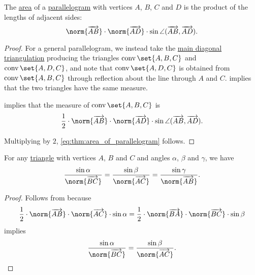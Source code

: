 \begin{proposition}\label{thm:area_of_parallelogram}
  The \hyperref[def:figure_area]{area} of a \hyperref[def:parallelogram]{parallelogram} with vertices \( A \), \( B \), \( C \) and \( D \) is the product of the lengths of adjacent sides:
  \begin{equation}\label{eq:thm:area_of_parallelogram}
    \norm{\vect{AB}} \cdot \norm{\vect{AD}} \cdot \sin\angle(\vect{AB}, \vect{AD}).
  \end{equation}
\end{proposition}
\begin{proof}
  For a general parallelogram, we instead take the \hyperref[thm:diagonal_trapezoid_triangulation]{main diagonal triangulation} producing the triangles \( \conv\set{ A, B, C } \) and \( \conv\set{ A, D, C } \), and note that \( \conv\set{ A, D, C } \) is obtained from \( \conv\set{ A, B, C } \) through reflection about the line through \( A \) and \( C \).  implies that the two triangles have the same measure.

   implies that the measure of \( \conv\set{ A, B, C } \) is
  \begin{equation*}
    \frac 1 2 \cdot \norm{\vect{AB}} \cdot \norm{\vect{AD}} \cdot \sin\angle(\vect{AB}, \vect{AD}).
  \end{equation*}

  Multiplying by \( 2 \), \eqref{eq:thm:area_of_parallelogram} follows.
\end{proof}

\begin{theorem}\label{thm:law_of_sines}
  For any \hyperref[def:triangle]{triangle} with vertices \( A \), \( B \) and \( C \) and angles \( \alpha \), \( \beta \) and \( \gamma \), we have
  \begin{equation}\label{eq:thm:law_of_sines}
    \frac {\sin \alpha} {\norm{\vect{BC}}}
    =
    \frac {\sin \beta} {\norm{\vect{AC}}}
    =
    \frac {\sin \gamma} {\norm{\vect{AB}}}.
  \end{equation}
\end{theorem}
\begin{proof}
  Follows from  because
  \begin{equation*}
    \frac 1 2 \cdot \norm{\vect{AB}} \cdot \norm{\vect{AC}} \cdot \sin \alpha
    =
    \frac 1 2 \cdot \norm{\vect{BA}} \cdot \norm{\vect{BC}} \cdot \sin \beta
  \end{equation*}
  implies
  \begin{equation*}
    \frac {\sin \alpha} {\norm{\vect{BC}}}
    =
    \frac {\sin \beta} {\norm{\vect{AC}}}.
  \end{equation*}
\end{proof}

